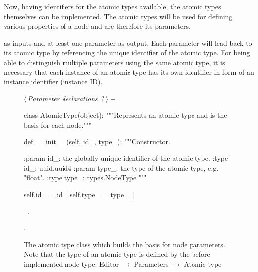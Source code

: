 \documentclass[%
    a4paper,    %
    justified,  %
    nobib,      %
    openany     %
]{tufte-book}
\begin{document}
Now, having identifiers for the atomic types available, the atomic types
themselves can be implemented. The atomic types will be used for defining
various properties of a node and are therefore its parameters.

 as inputs and at least
one parameter as output. Each parameter will lead back to its atomic type by
referencing the unique identifier of the atomic type. For being able to
distinguish multiple parameters using the same atomic type, it is necessary that
each instance of an atomic type has its own identifier in form of an instance
identifier (instance ID).

\begin{figure}
\begin{flushleft} \small
\begin{minipage}{\linewidth}\label{scrap64}\raggedright\small
{} $\langle\,${\itshape Parameter declarations}\nobreak\ {\footnotesize {?}}$\,\rangle\equiv$
\vspace{-1ex}
\begin{pythoncode}
class AtomicType(object):
    """Represents an atomic type and is the basis for each node."""

    def __init__(self, id_, type_):
        """Constructor.

        :param id_: the globally unique identifier of the atomic type.
        :type  id_: uuid.uuid4
        :param type_: the type of the atomic type, e.g. "float".
        :type  type_: types.NodeType
        """

        self.id_   = id_
        self.type_ = type_
|\NWsep|
\end{pythoncode}
\vspace{1.5ex}
\footnotesize
\begin{list}{}{\setlength{\itemsep}{-\parsep}\setlength{\itemindent}{-\leftmargin}}
\item \NWtxtMacroDefBy\ .
\item {\NWtxtMacroNoRef}.

\item{}
\end{list}
\end{minipage}\vspace{4ex}
\end{flushleft}
\caption{The atomic type class which builds the basis for node parameters. Note
  that the type of an atomic type is defined by the before implemented node
  type.
  \newline{}\newline{}Editor $\rightarrow$ Parameters $\rightarrow$ Atomic type}
\label{editor:lst:parameters:atomic-type}
\end{figure}
\end{document}
